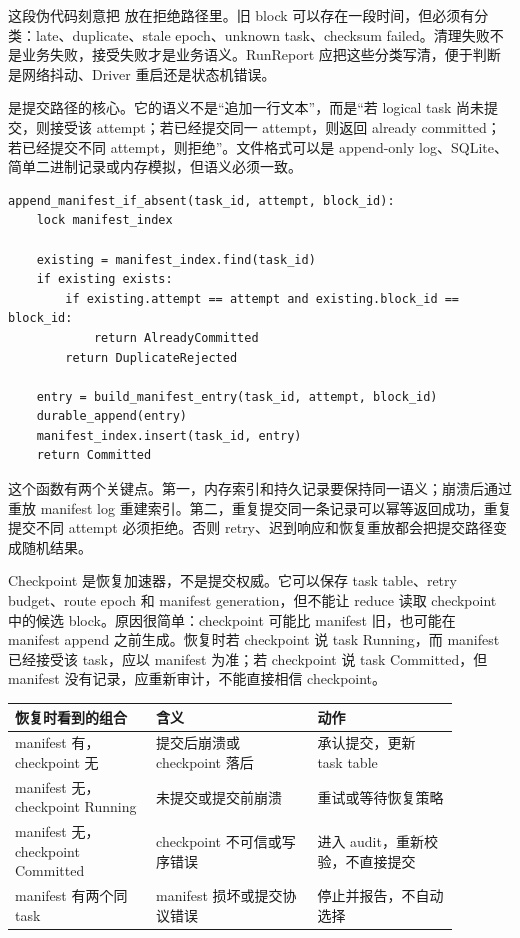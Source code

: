 这段伪代码刻意把  放在拒绝路径里。旧 block 可以存在一段时间，但必须有分类：late、duplicate、stale epoch、unknown task、checksum failed。清理失败不是业务失败，接受失败才是业务语义。RunReport 应把这些分类写清，便于判断是网络抖动、Driver 重启还是状态机错误。

 是提交路径的核心。它的语义不是“追加一行文本”，而是“若 logical task 尚未提交，则接受该 attempt；若已经提交同一 attempt，则返回 already committed；若已经提交不同 attempt，则拒绝”。文件格式可以是 append-only log、SQLite、简单二进制记录或内存模拟，但语义必须一致。

\begin{lstlisting}[numbers=none,caption={幂等 manifest 提交的语义伪代码}]
append_manifest_if_absent(task_id, attempt, block_id):
    lock manifest_index

    existing = manifest_index.find(task_id)
    if existing exists:
        if existing.attempt == attempt and existing.block_id == block_id:
            return AlreadyCommitted
        return DuplicateRejected

    entry = build_manifest_entry(task_id, attempt, block_id)
    durable_append(entry)
    manifest_index.insert(task_id, entry)
    return Committed
\end{lstlisting}

这个函数有两个关键点。第一，内存索引和持久记录要保持同一语义；崩溃后通过重放 manifest log 重建索引。第二，重复提交同一条记录可以幂等返回成功，重复提交不同 attempt 必须拒绝。否则 retry、迟到响应和恢复重放都会把提交路径变成随机结果。

Checkpoint 是恢复加速器，不是提交权威。它可以保存 task table、retry budget、route epoch 和 manifest generation，但不能让 reduce 读取 checkpoint 中的候选 block。原因很简单：checkpoint 可能比 manifest 旧，也可能在 manifest append 之前生成。恢复时若 checkpoint 说 task Running，而 manifest 已经接受该 task，应以 manifest 为准；若 checkpoint 说 task Committed，但 manifest 没有记录，应重新审计，不能直接相信 checkpoint。

\begin{center}
\begin{tabular}{p{0.28\linewidth}p{0.32\linewidth}p{0.28\linewidth}}
\toprule
恢复时看到的组合 & 含义 & 动作 \\
\midrule
manifest 有，checkpoint 无 & 提交后崩溃或 checkpoint 落后 & 承认提交，更新 task table \\
manifest 无，checkpoint Running & 未提交或提交前崩溃 & 重试或等待恢复策略 \\
manifest 无，checkpoint Committed & checkpoint 不可信或写序错误 & 进入 audit，重新校验，不直接提交 \\
manifest 有两个同 task & manifest 损坏或提交协议错误 & 停止并报告，不自动选择 \\
\bottomrule
\end{tabular}
\end{center}

